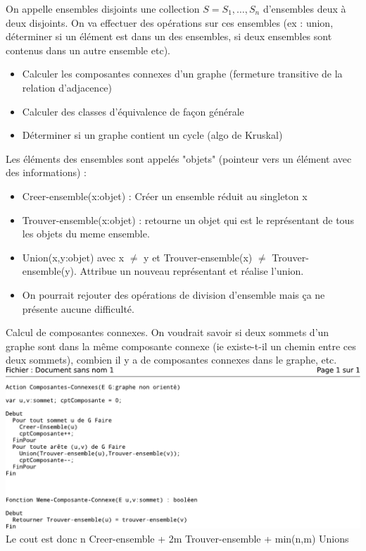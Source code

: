  On appelle ensembles disjoints une collection $S=S_1,\ldots,S_n$ d'ensembles deux à deux disjoints. On va effectuer des opérations sur ces ensembles (ex : union, déterminer si un élément est dans un des ensembles, si deux ensembles sont contenus dans un autre ensemble etc). \\

\begin{itemize}
	\item Calculer les composantes connexes d'un graphe (fermeture transitive de la relation d'adjacence)
	\item Calculer des classes d'équivalence de façon générale
	\item Déterminer si un graphe contient un cycle (algo de Kruskal)
\end{itemize}

 Les éléments des ensembles sont appelés "objets" (pointeur vers un élément avec des informations) :
\begin{itemize}
	\item Creer-ensemble(x:objet) : Créer un ensemble réduit au singleton x
	\item Trouver-ensemble(x:objet) : retourne un objet qui est le représentant de tous les objets du meme ensemble.
	\item Union(x,y:objet) avec x $\neq$ y et Trouver-ensemble(x) $\neq$ Trouver-ensemble(y). Attribue un nouveau représentant et réalise l'union.
	\item On pourrait rejouter des opérations de division d'ensemble mais ça ne présente aucune difficulté.
\end{itemize}

 Calcul de composantes connexes. On voudrait savoir si deux sommets d'un graphe sont dans la même composante connexe (ie existe-t-il un chemin entre ces deux sommets), combien il y a de composantes connexes dans le graphe, etc. \\
\includegraphics{Images/fig3.pdf} \\
Le cout est donc n Creer-ensemble + 2m Trouver-ensemble + min(n,m) Unions \\

